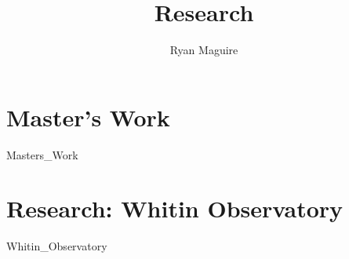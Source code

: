 \documentclass[crop=false,class=book,oneside]{standalone}
\begin{document}
    \newif\ifresearch
    \ifx\ifmain\undefined
        \title{Research}
        \author{Ryan Maguire}
        \date{\vspace{-5ex}}
        \maketitle
        \tableofcontents
        \listoffigures
        \listoftables
        \clearpage
    \fi
    \part{Master's Work}
        {Masters_Work}
    \part{Research: Whitin Observatory}
        {Whitin_Observatory}
    \ifstandalone
        
    \fi
\end{document}
